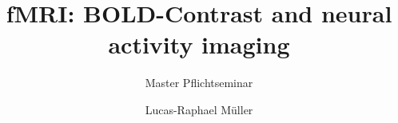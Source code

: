 %
%
%
% 
%
%

\documentclass[a4paper]{scrartcl}
\usepackage[english]{babel}
\usepackage[utf8]{inputenc}
\usepackage{amsmath}
\usepackage{graphicx}
\usepackage{caption}
\usepackage{subcaption}
\usepackage[colorinlistoftodos]{todonotes}

\usepackage{footnote}

\usepackage[babel,english=british]{csquotes} %
\usepackage[backend=biber]{biblatex} %




\title{fMRI: BOLD-Contrast and neural activity imaging}
\subtitle{Master Pflichtseminar}
\author{Lucas-Raphael Müller}
\maketitle

\begin{abstract}
Your abstract.
\end{abstract}

\tableofcontents

